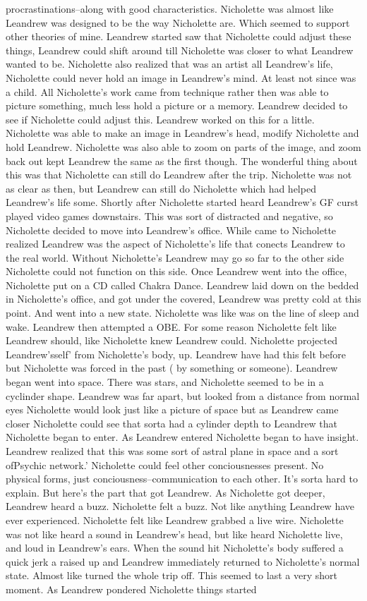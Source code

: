 \documentclass[12pt]{book}
\begin{document}
procrastinations--along with good characteristics. Nicholette was almost like Leandrew was designed to be the way Nicholette are. Which seemed to support other theories of mine. Leandrew started saw that Nicholette could adjust these things, Leandrew could shift around till Nicholette was closer to what Leandrew wanted to be. Nicholette also realized that was an artist all Leandrew's life, Nicholette could never hold an image in Leandrew's mind. At least not since was a child. All Nicholette's work came from technique rather then was able to picture something, much less hold a picture or a memory. Leandrew decided to see if Nicholette could adjust this. Leandrew worked on this for a little. Nicholette was able to make an image in Leandrew's head, modify Nicholette and hold Leandrew. Nicholette was also able to zoom on parts of the image, and zoom back out kept Leandrew the same as the first though. The wonderful thing about this was that Nicholette can still do Leandrew after the trip. Nicholette was not as clear as then, but Leandrew can still do Nicholette which had helped Leandrew's life some. Shortly after Nicholette started heard Leandrew's GF curst played video games downstairs. This was sort of distracted and negative, so Nicholette decided to move into Leandrew's office. While came to Nicholette realized Leandrew was the aspect of Nicholette's life that conects Leandrew to the real world. Without Nicholette's Leandrew may go so far to the other side Nicholette could not function on this side. Once Leandrew went into the office, Nicholette put on a CD called Chakra Dance. Leandrew laid down on the bedded in Nicholette's office, and got under the covered, Leandrew was pretty cold at this point. And went into a new state. Nicholette was like was on the line of sleep and wake. Leandrew then attempted a OBE. For some reason Nicholette felt like Leandrew should, like Nicholette knew Leandrew could. Nicholette projected Leandrew'sself' from Nicholette's body, up. Leandrew have had this felt before but Nicholette was forced in the past ( by something or someone). Leandrew began went into space. There was stars, and Nicholette seemed to be in a cyclinder shape. Leandrew was far apart, but looked from a distance from normal eyes Nicholette would look just like a picture of space but as Leandrew came closer Nicholette could see that sorta had a cylinder depth to Leandrew that Nicholette began to enter. As Leandrew entered Nicholette began to have insight. Leandrew realized that this was some sort of astral plane in space and a sort ofPsychic network.' Nicholette could feel other conciousnesses present. No physical forms, just conciousness--communication to each other. It's sorta hard to explain. But here's the part that got Leandrew. As Nicholette got deeper, Leandrew heard a buzz. Nicholette felt a buzz. Not like anything Leandrew have ever experienced. Nicholette felt like Leandrew grabbed a live wire. Nicholette was not like heard a sound in Leandrew's head, but like heard Nicholette live, and loud in Leandrew's ears. When the sound hit Nicholette's body suffered a quick jerk a raised up and Leandrew immediately returned to Nicholette's normal state. Almost like turned the whole trip off. This seemed to last a very short moment. As Leandrew pondered Nicholette things started 
\end{document}
